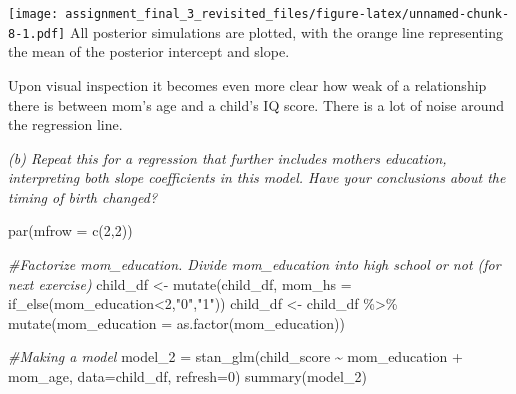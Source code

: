 \documentclass[
]{article}
\newenvironment{Shaded}{\begin{snugshade}}{\end{snugshade}}
\newcommand{\AttributeTok}[1]{\textcolor[rgb]{0.77,0.63,0.00}{#1}}
\newcommand{\CommentTok}[1]{\textcolor[rgb]{0.56,0.35,0.01}{\textit{#1}}}
\newcommand{\DecValTok}[1]{\textcolor[rgb]{0.00,0.00,0.81}{#1}}
\newcommand{\FunctionTok}[1]{\textcolor[rgb]{0.00,0.00,0.00}{#1}}
\newcommand{\NormalTok}[1]{#1}
\newcommand{\OtherTok}[1]{\textcolor[rgb]{0.56,0.35,0.01}{#1}}
\newcommand{\SpecialCharTok}[1]{\textcolor[rgb]{0.00,0.00,0.00}{#1}}
\newcommand{\StringTok}[1]{\textcolor[rgb]{0.31,0.60,0.02}{#1}}
\begin{document}
\texttt{[image: assignment\_final\_3\_revisited\_files/figure-latex/unnamed-chunk-8-1.pdf]}
All posterior simulations are plotted, with the orange line representing
the mean of the posterior intercept and slope.

Upon visual inspection it becomes even more clear how weak of a
relationship there is between mom's age and a child's IQ score. There is
a lot of noise around the regression line.

\emph{(b) Repeat this for a regression that further includes mothers
education, interpreting both slope coefficients in this model. Have your
conclusions about the timing of birth changed?}

\begin{Shaded}
\begin{Highlighting}[]
\FunctionTok{par}\NormalTok{(}\AttributeTok{mfrow =} \FunctionTok{c}\NormalTok{(}\DecValTok{2}\NormalTok{,}\DecValTok{2}\NormalTok{))}

\CommentTok{\#Factorize mom\_education. Divide mom\_education into high school or not (for next exercise)}
\NormalTok{child\_df }\OtherTok{\textless{}{-}} \FunctionTok{mutate}\NormalTok{(child\_df, }\AttributeTok{mom\_hs =} \FunctionTok{if\_else}\NormalTok{(mom\_education}\SpecialCharTok{\textless{}}\DecValTok{2}\NormalTok{,}\StringTok{"0"}\NormalTok{,}\StringTok{"1"}\NormalTok{))}
\NormalTok{child\_df }\OtherTok{\textless{}{-}}\NormalTok{ child\_df }\SpecialCharTok{\%\textgreater{}\%} \FunctionTok{mutate}\NormalTok{(}\AttributeTok{mom\_education =} \FunctionTok{as.factor}\NormalTok{(mom\_education))}

\CommentTok{\#Making a model}
\NormalTok{model\_2 }\OtherTok{=} \FunctionTok{stan\_glm}\NormalTok{(child\_score }\SpecialCharTok{\textasciitilde{}}\NormalTok{ mom\_education }\SpecialCharTok{+}\NormalTok{ mom\_age, }\AttributeTok{data=}\NormalTok{child\_df, }\AttributeTok{refresh=}\DecValTok{0}\NormalTok{)}
\FunctionTok{summary}\NormalTok{(model\_2)}
\end{Highlighting}
\end{Shaded}
\end{document}
